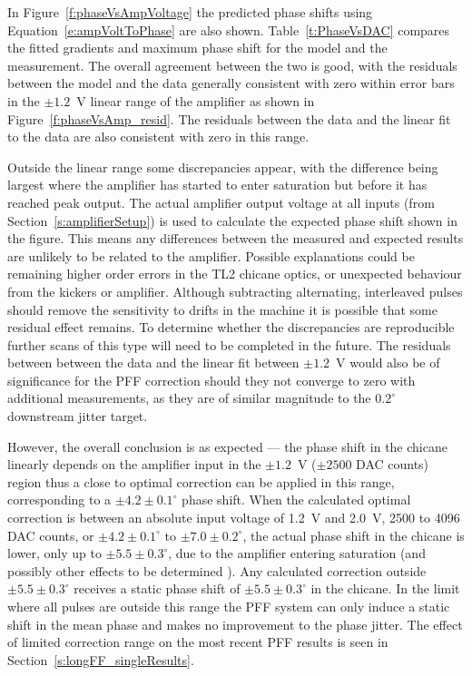 In Figure~\ref{f:phaseVsAmpVoltage} the predicted phase shifts using Equation~\ref{e:ampVoltToPhase} are also shown. Table~\ref{t:PhaseVsDAC} compares the fitted gradients and maximum phase shift for the model and the measurement. The overall agreement between the two is good, with the residuals between the model and the data generally consistent with zero within error bars in the \(\pm1.2\)~V linear range of the amplifier as shown in Figure~\ref{f:phaseVsAmp_resid}. The residuals between the data and the linear 
fit to the data are also consistent with zero in this range.

Outside the linear range some discrepancies appear, with the difference being largest where the amplifier has started to enter saturation but before it has reached peak output. 
The actual amplifier output voltage at all inputs (from
 Section~\ref{s:amplifierSetup}) is used to calculate the expected phase shift shown in the figure. This means any differences between the measured and expected results are unlikely to be related to the amplifier.
Possible explanations could be remaining higher order errors in the TL2 chicane optics, or unexpected behaviour from the kickers or amplifier. Although subtracting alternating, interleaved pulses should remove the sensitivity to drifts in the machine it is possible that some residual effect remains. To determine whether the discrepancies are reproducible further scans of this type will need to be completed in the future. The residuals between between the data and the linear fit between \(\pm1.2\)~V would also be of significance for the PFF correction should they not converge to zero with additional measurements, as they are of similar magnitude to the \(0.2^\circ\) downstream jitter target. 

However, the overall conclusion is as expected --- the phase shift in the chicane linearly depends on the amplifier input in the \(\pm1.2\)~V (\(\pm2500\) DAC counts) region thus a close to optimal correction can be applied in this range, corresponding to a \(\pm4.2\pm0.1^\circ\) phase shift. When the calculated optimal correction is between an absolute input voltage of 1.2~V and 2.0~V, 2500 to 4096 DAC counts, or \(\pm4.2\pm0.1^\circ\) to \(\pm7.0\pm0.2^\circ\), the actual phase shift in the chicane is lower, only up to \(\pm5.5\pm0.3^\circ\), due to the amplifier entering saturation (and possibly other effects to be determined ). Any calculated correction outside \(\pm5.5\pm0.3^\circ\) receives a static phase shift of \(\pm5.5\pm0.3^\circ\) in the chicane. In the limit where all pulses are outside this range the PFF system can only induce a static shift in the mean phase and makes no improvement to the phase jitter. The effect of limited correction range on the most recent PFF results is seen in Section~\ref{s:longFF_singleResults}.


